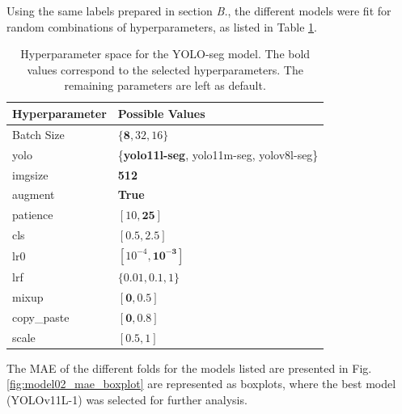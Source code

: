\documentclass[conference]{IEEEtran}
\begin{document}
Using the same labels prepared in section \textit{B.}, the different models were fit for random combinations of hyperparameters, as  listed in Table \ref{parametrosseg}.



\begin{table}[H]
\centering
\caption{Hyperparameter space for the YOLO-seg model. The
bold values correspond to the selected hyperparameters. The remaining parameters are left as default.}
\label{parametrosseg}
\begin{tabular}{ll}
\toprule
\textbf{Hyperparameter} & \textbf{Possible Values} \\
\midrule
Batch Size & $\{\mathbf{8}, 32, 16\}$ \\
yolo & \{\textbf{yolo11l-seg}, yolo11m-seg, yolov8l-seg\} \\
imgsize & \textbf{512} \\
augment & \textbf{True} \\
patience & $[10, \mathbf{25}]$ \\
cls & $[\mathbf{0.5}, 2.5]$ \\
lr0 & $[10^{-4}, \mathbf{10^{-3}}]$ \\
lrf & $\{0.01, \mathbf{0.1}, 1\}$ \\
mixup & $[\mathbf{0}, 0.5]$ \\
copy\_paste & $[\mathbf{0}, 0.8]$ \\
scale & $[\mathbf{0.5}, 1]$ \\
\bottomrule
\end{tabular}
\end{table}

The MAE of the different folds for the models listed are presented in Fig. \ref{fig:model02_mae_boxplot} are represented as boxplots, where the best model (YOLOv11L-1) was selected for further analysis.
\end{document}
